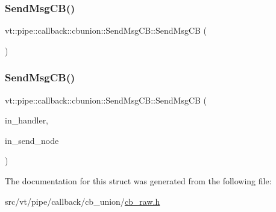 \subsubsection{\texorpdfstring{Send\+Msg\+C\+B()}{SendMsgCB()}\hspace{0.1cm}{\footnotesize\ttfamily [1/2]}}
{\footnotesize\ttfamily vt\+::pipe\+::callback\+::cbunion\+::\+Send\+Msg\+C\+B\+::\+Send\+Msg\+CB (\begin{DoxyParamCaption}{ }\end{DoxyParamCaption})\hspace{0.3cm}{\ttfamily [default]}}

\mbox{\label{structvt_1_1pipe_1_1callback_1_1cbunion_1_1_send_msg_c_b_a10c77770d00c2a7f40036b4d7d147502}} 
\subsubsection{\texorpdfstring{Send\+Msg\+C\+B()}{SendMsgCB()}\hspace{0.1cm}{\footnotesize\ttfamily [2/2]}}
{\footnotesize\ttfamily vt\+::pipe\+::callback\+::cbunion\+::\+Send\+Msg\+C\+B\+::\+Send\+Msg\+CB (\begin{DoxyParamCaption}\item[{\hyperlink{namespacevt_af64846b57dfcaf104da3ef6967917573}{Handler\+Type} const}]{in\+\_\+handler,  }\item[{\hyperlink{namespacevt_a866da9d0efc19c0a1ce79e9e492f47e2}{Node\+Type} const \&}]{in\+\_\+send\+\_\+node }\end{DoxyParamCaption})\hspace{0.3cm}{\ttfamily [inline]}}



The documentation for this struct was generated from the following file\+:\begin{DoxyCompactItemize}
\item 
src/vt/pipe/callback/cb\+\_\+union/\hyperlink{cb__raw_8h}{cb\+\_\+raw.\+h}\end{DoxyCompactItemize}

